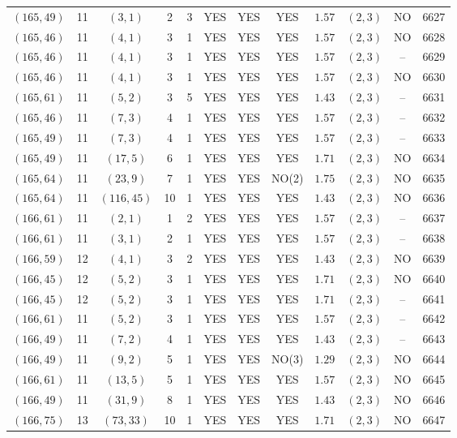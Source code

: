 \begin{longtable}{|c|c|c|c|c|c|c|c|c|c|c|c|}
$(165,49)$ & 11 & $(3,1)$ & 2 & 3 & YES & YES & YES & $1.57$ & $(2,3)$ & NO & 6627\\
$(165,46)$ & 11 & $(4,1)$ & 3 & 1 & YES & YES & YES & $1.57$ & $(2,3)$ & NO & 6628\\
$(165,46)$ & 11 & $(4,1)$ & 3 & 1 & YES & YES & YES & $1.57$ & $(2,3)$ & -- & 6629\\
$(165,46)$ & 11 & $(4,1)$ & 3 & 1 & YES & YES & YES & $1.57$ & $(2,3)$ & NO & 6630\\
$(165,61)$ & 11 & $(5,2)$ & 3 & 5 & YES & YES & YES & $1.43$ & $(2,3)$ & -- & 6631\\
$(165,46)$ & 11 & $(7,3)$ & 4 & 1 & YES & YES & YES & $1.57$ & $(2,3)$ & -- & 6632\\
$(165,49)$ & 11 & $(7,3)$ & 4 & 1 & YES & YES & YES & $1.57$ & $(2,3)$ & -- & 6633\\
$(165,49)$ & 11 & $(17,5)$ & 6 & 1 & YES & YES & YES & $1.71$ & $(2,3)$ & NO & 6634\\
$(165,64)$ & 11 & $(23,9)$ & 7 & 1 & YES & YES & NO(2) & $1.75$ & $(2,3)$ & NO & 6635\\
$(165,64)$ & 11 & $(116,45)$ & 10 & 1 & YES & YES & YES & $1.43$ & $(2,3)$ & NO & 6636\\
$(166,61)$ & 11 & $(2,1)$ & 1 & 2 & YES & YES & YES & $1.57$ & $(2,3)$ & -- & 6637\\
$(166,61)$ & 11 & $(3,1)$ & 2 & 1 & YES & YES & YES & $1.57$ & $(2,3)$ & -- & 6638\\
$(166,59)$ & 12 & $(4,1)$ & 3 & 2 & YES & YES & YES & $1.43$ & $(2,3)$ & NO & 6639\\
$(166,45)$ & 12 & $(5,2)$ & 3 & 1 & YES & YES & YES & $1.71$ & $(2,3)$ & NO & 6640\\
$(166,45)$ & 12 & $(5,2)$ & 3 & 1 & YES & YES & YES & $1.71$ & $(2,3)$ & -- & 6641\\
$(166,61)$ & 11 & $(5,2)$ & 3 & 1 & YES & YES & YES & $1.57$ & $(2,3)$ & -- & 6642\\
$(166,49)$ & 11 & $(7,2)$ & 4 & 1 & YES & YES & YES & $1.43$ & $(2,3)$ & -- & 6643\\
$(166,49)$ & 11 & $(9,2)$ & 5 & 1 & YES & YES & NO(3) & $1.29$ & $(2,3)$ & NO & 6644\\
$(166,61)$ & 11 & $(13,5)$ & 5 & 1 & YES & YES & YES & $1.57$ & $(2,3)$ & NO & 6645\\
$(166,49)$ & 11 & $(31,9)$ & 8 & 1 & YES & YES & YES & $1.43$ & $(2,3)$ & NO & 6646\\
$(166,75)$ & 13 & $(73,33)$ & 10 & 1 & YES & YES & YES & $1.71$ & $(2,3)$ & NO & 6647\\

\end{longtable}
